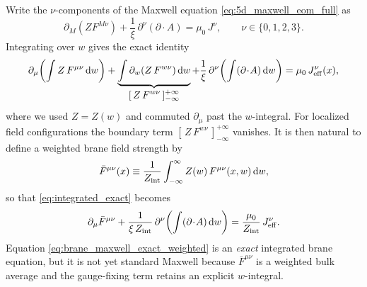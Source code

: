 \documentclass[11pt]{article}
\newcommand{\dd}{\mathrm d}
\newcommand{\A}{A}
\newcommand{\F}{F}
\newcommand{\J}{J}
\newcommand{\Z}{Z}
\newcommand{\Zint}{Z_{\rm int}} %
\newcommand{\muo}{\mu_0}
\newcommand{\xigf}{\xi}
\begin{document}
Write the \(\nu\)-components of the Maxwell equation \cref{eq:5d_maxwell_eom_full}
as
\begin{equation}
  \partial_M\!\left(\Z \F^{M\nu}\right)
  + \frac{1}{\xigf}\,\partial^\nu(\partial\!\cdot\!\A)
  = \muo\,\J^\nu,
  \qquad \nu\in\{0,1,2,3\}.
  \label{eq:eom_nu}
\end{equation}
Integrating over \(w\) gives the exact identity
\begin{equation}
  \partial_\mu \!\left(\int \Z\,\F^{\mu\nu}\,\dd w\right)
  + \underbrace{\int \partial_w\!\left(\Z\,\F^{w\nu}\right)\dd w}_{\displaystyle [\,\Z\,\F^{w\nu}\,]_{-\infty}^{+\infty}}
  + \frac{1}{\xigf}\,\partial^\nu\!\left(\int (\partial\!\cdot\!\A)\,\dd w\right)
  = \muo\,\J_{\rm eff}^\nu(x),
  \label{eq:integrated_exact}
\end{equation}
where we used \(\Z=\Z(w)\) and commuted \(\partial_\mu\) past the \(w\)-integral.
For localized field configurations the boundary term
\([\,\Z\,\F^{w\nu}\,]_{-\infty}^{+\infty}\) vanishes. It is then natural to define
a weighted brane field strength by
\begin{equation}
  \bar{\F}^{\mu\nu}(x) \equiv \frac{1}{\Zint}\int_{-\infty}^{\infty}\Z(w)\,\F^{\mu\nu}(x,w)\,\dd w,
  \label{eq:Fbar_def}
\end{equation}
so that \cref{eq:integrated_exact} becomes
\begin{equation}
  \partial_\mu \bar{\F}^{\mu\nu}
  + \frac{1}{\xigf\,\Zint}\,\partial^\nu\!\left(\int (\partial\!\cdot\!\A)\,\dd w\right)
  = \frac{\muo}{\Zint}\,\J_{\rm eff}^\nu.
  \label{eq:brane_maxwell_exact_weighted}
\end{equation}
Equation \cref{eq:brane_maxwell_exact_weighted} is an \emph{exact} integrated
brane equation, but it is not yet standard Maxwell because \(\bar{\F}^{\mu\nu}\)
is a weighted bulk average and the gauge-fixing term retains an explicit
\(w\)-integral.
\end{document}
